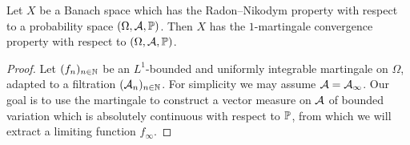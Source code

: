 \begin{thm}
  Let $X$ be a Banach space which has the Radon--Nikodym property with respect to a probability space $(\Omega,\mc{A},\P)$.
  Then $X$ has the $1$-martingale convergence property with respect to $(\Omega,\mc{A},\P)$.
\end{thm}

\begin{proof}
  Let $(f_n)_{n \in \N}$ be an $L^1$-bounded and uniformly integrable martingale on $\Omega$, adapted to a filtration $(\mc{A}_n)_{n \in \N}$.
  For simplicity we may assume $\mc{A} = \mc{A}_\infty$.
  Our goal is to use the martingale to construct a vector measure on $\mc{A}$ of bounded variation which is absolutely continuous with respect to $\P$, from which we will extract a limiting function $f_\infty$.


\end{proof}
